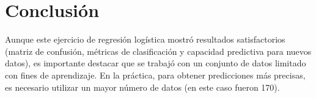 \documentclass{article}
\begin{document}
\section{Conclusión}
Aunque este ejercicio de regresión logística mostró resultados satisfactorios (matriz de confusión, métricas de clasificación y capacidad predictiva para nuevos datos), es importante destacar que se trabajó con un conjunto de datos limitado con fines de aprendizaje. En la práctica, para obtener predicciones más precisas, es necesario utilizar un mayor número de datos (en este caso fueron 170).
\end{document}
